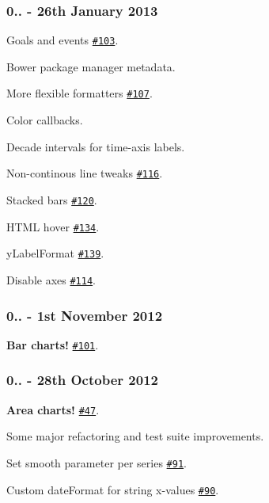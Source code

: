 \subsubsection*{0.. -\/ 26th January 2013}


\begin{DoxyItemize}
\item Goals and events \href{https://github.com/morrisjs/morris.js/issues/103}{\tt \#103}.
\item Bower package manager metadata.
\item More flexible formatters \href{https://github.com/morrisjs/morris.js/issues/107}{\tt \#107}.
\item Color callbacks.
\item Decade intervals for time-\/axis labels.
\item Non-\/continous line tweaks \href{https://github.com/morrisjs/morris.js/issues/116}{\tt \#116}.
\item Stacked bars \href{https://github.com/morrisjs/morris.js/issues/120}{\tt \#120}.
\item H\+T\+ML hover \href{https://github.com/morrisjs/morris.js/issues/134}{\tt \#134}.
\item y\+Label\+Format \href{https://github.com/morrisjs/morris.js/issues/139}{\tt \#139}.
\item Disable axes \href{https://github.com/morrisjs/morris.js/issues/114}{\tt \#114}.
\end{DoxyItemize}

\subsubsection*{0.. -\/ 1st November 2012}


\begin{DoxyItemize}
\item {\bfseries Bar charts!} \href{https://github.com/morrisjs/morris.js/issues/101}{\tt \#101}.
\end{DoxyItemize}

\subsubsection*{0.. -\/ 28th October 2012}


\begin{DoxyItemize}
\item {\bfseries Area charts!} \href{https://github.com/morrisjs/morris.js/issues/47}{\tt \#47}.
\item Some major refactoring and test suite improvements.
\item Set smooth parameter per series \href{https://github.com/morrisjs/morris.js/issues/91}{\tt \#91}.
\item Custom date\+Format for string x-\/values \href{https://github.com/morrisjs/morris.js/issues/90}{\tt \#90}.
\end{DoxyItemize}

